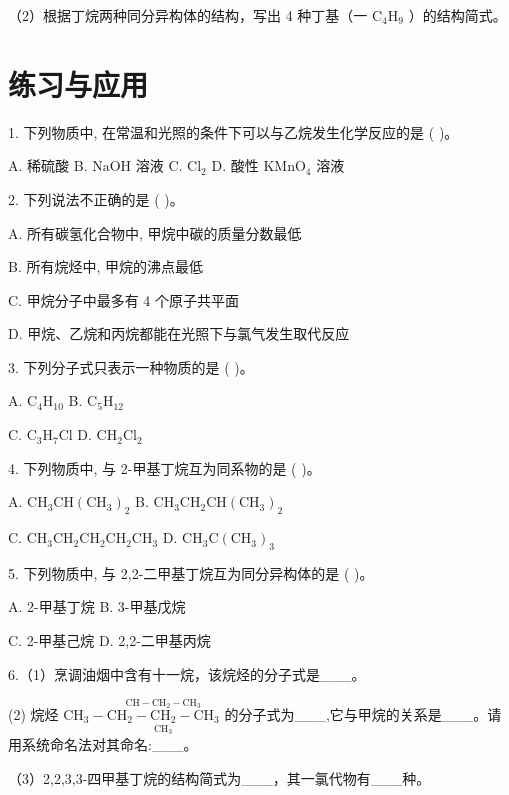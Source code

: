 \documentclass[10pt]{article}
\begin{document}
（2）根据丁烷两种同分异构体的结构，写出 4 种丁基（一 \({\mathrm{C}}_{4}{\mathrm{H}}_{9}\) ）的结构简式。

\section*{练习与应用}

1. 下列物质中, 在常温和光照的条件下可以与乙烷发生化学反应的是 ( )。

A. 稀硫酸 B. \(\mathrm{{NaOH}}\) 溶液 C. \({\mathrm{{Cl}}}_{2}\) D. 酸性 \({\mathrm{{KMnO}}}_{4}\) 溶液

2. 下列说法不正确的是 ( )。

A. 所有碳氢化合物中, 甲烷中碳的质量分数最低

B. 所有烷烃中, 甲烷的沸点最低

C. 甲烷分子中最多有 4 个原子共平面

D. 甲烷、乙烷和丙烷都能在光照下与氯气发生取代反应

3. 下列分子式只表示一种物质的是 ( )。

A. \({\mathrm{C}}_{4}{\mathrm{H}}_{10}\) B. \({\mathrm{C}}_{5}{\mathrm{H}}_{12}\)

C. \({\mathrm{C}}_{3}{\mathrm{H}}_{7}\mathrm{{Cl}}\) D. \({\mathrm{{CH}}}_{2}{\mathrm{{Cl}}}_{2}\)

4. 下列物质中, 与 2-甲基丁烷互为同系物的是 ( )。

A. \({\mathrm{{CH}}}_{3}\mathrm{{CH}}{\left( {\mathrm{{CH}}}_{3}\right) }_{2}\) B. \({\mathrm{{CH}}}_{3}{\mathrm{{CH}}}_{2}\mathrm{{CH}}{\left( {\mathrm{{CH}}}_{3}\right) }_{2}\)

C. \({\mathrm{{CH}}}_{3}{\mathrm{{CH}}}_{2}{\mathrm{{CH}}}_{2}{\mathrm{{CH}}}_{2}{\mathrm{{CH}}}_{3}\) D. \({\mathrm{{CH}}}_{3}\mathrm{C}{\left( {\mathrm{{CH}}}_{3}\right) }_{3}\)

5. 下列物质中, 与 2,2-二甲基丁烷互为同分异构体的是 ( )。

A. 2-甲基丁烷 B. 3-甲基戊烷

C. 2-甲基己烷 D. 2,2-二甲基丙烷

6.（1）烹调油烟中含有十一烷，该烷烃的分子式是\_\_\_。

(2) 烷烃 \({\mathrm{{CH}}}_{3} - \underset{{\mathrm{{CH}}}_{3}}{\overset{\mathrm{{CH}} - {\mathrm{{CH}}}_{2} - {\mathrm{{CH}}}_{3}}{{\mathrm{{CH}}}_{2} - {\mathrm{{CH}}}_{2} - {\mathrm{{CH}}}_{3}}}\) 的分子式为\_\_\_,它与甲烷的关系是\_\_\_。请用系统命名法对其命名:\_\_\_。

（3）2,2,3,3-四甲基丁烷的结构简式为\_\_\_，其一氯代物有\_\_\_种。
\end{document}
